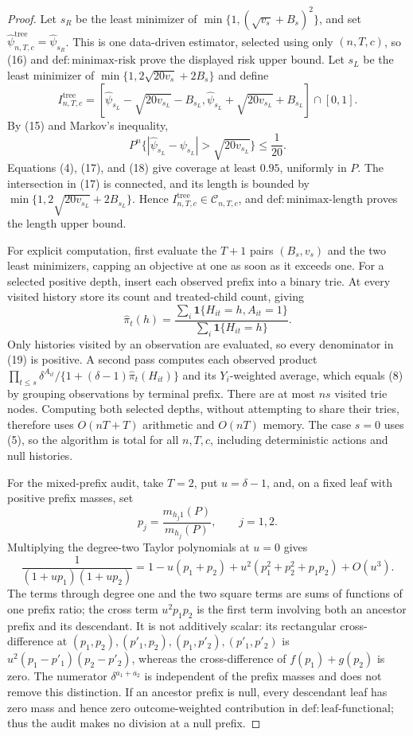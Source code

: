 \documentclass{article}
\begin{document}
\begin{proof}
Let \(s_R\) be the least minimizer of \(\min\{1,(\sqrt{v_s}+B_s)^2\}\), and set \(\widehat\psi^{\mathrm{tree}}_{n,T,c}=\widehat\psi_{s_R}\).  This is one data-driven estimator, selected using only \((n,T,c)\), so (16) and \(\mathrm{def:minimax\text{-}risk}\) prove the displayed risk upper bound.  Let \(s_L\) be the least minimizer of \(\min\{1,2\sqrt{20v_s}+2B_s\}\) and define
\[
I^{\mathrm{tree}}_{n,T,c}
=\left[\widehat\psi_{s_L}-\sqrt{20v_{s_L}}-B_{s_L},
        \widehat\psi_{s_L}+\sqrt{20v_{s_L}}+B_{s_L}\right]\cap[0,1].
\tag{17}
\]
By (15) and Markov's inequality,
\[
P^n\{|\widehat\psi_{s_L}-\psi_{s_L}|>\sqrt{20v_{s_L}}\}\leq\frac1{20}.
\tag{18}
\]
Equations (4), (17), and (18) give coverage at least \(0.95\), uniformly in \(P\).  The intersection in (17) is connected, and its length is bounded by \(\min\{1,2\sqrt{20v_{s_L}}+2B_{s_L}\}\).  Hence \(I^{\mathrm{tree}}_{n,T,c}\in\mathcal C_{n,T,c}\), and \(\mathrm{def:minimax\text{-}length}\) proves the length upper bound.

For explicit computation, first evaluate the \(T+1\) pairs \((B_s,v_s)\) and the two least minimizers, capping an objective at one as soon as it exceeds one.  For a selected positive depth, insert each observed prefix into a binary trie.  At every visited history store its count and treated-child count, giving
\[
\widehat\pi_t(h)=\frac{\sum_i\mathbf1\{H_{it}=h,A_{it}=1\}}
{\sum_i\mathbf1\{H_{it}=h\}}.
\tag{19}
\]
Only histories visited by an observation are evaluated, so every denominator in (19) is positive.  A second pass computes each observed product \(\prod_{t\leq s}\delta^{A_{it}}/\{1+(\delta-1)\widehat\pi_t(H_{it})\}\) and its \(Y_i\)-weighted average, which equals (8) by grouping observations by terminal prefix.  There are at most \(ns\) visited trie nodes.  Computing both selected depths, without attempting to share their tries, therefore uses \(O(nT+T)\) arithmetic and \(O(nT)\) memory.  The case \(s=0\) uses (5), so the algorithm is total for all \(n,T,c\), including deterministic actions and null histories.

For the mixed-prefix audit, take \(T=2\), put \(u=\delta-1\), and, on a fixed leaf with positive prefix masses, set
\[
p_j=\frac{m_{h_j1}(P)}{m_{h_j}(P)},\qquad j=1,2.
\tag{20}
\]
Multiplying the degree-two Taylor polynomials at \(u=0\) gives
\[
\frac1{(1+up_1)(1+up_2)}
=1-u(p_1+p_2)+u^2(p_1^2+p_2^2+p_1p_2)+O(u^3).
\tag{21}
\]
The terms through degree one and the two square terms are sums of functions of one prefix ratio; the cross term \(u^2p_1p_2\) is the first term involving both an ancestor prefix and its descendant.  It is not additively scalar: its rectangular cross-difference at \((p_1,p_2),(p'_1,p_2),(p_1,p'_2),(p'_1,p'_2)\) is \(u^2(p_1-p'_1)(p_2-p'_2)\), whereas the cross-difference of \(f(p_1)+g(p_2)\) is zero.  The numerator \(\delta^{a_1+a_2}\) is independent of the prefix masses and does not remove this distinction.  If an ancestor prefix is null, every descendant leaf has zero mass and hence zero outcome-weighted contribution in \(\mathrm{def:leaf\text{-}functional}\); thus the audit makes no division at a null prefix.


\end{proof}
\end{document}
